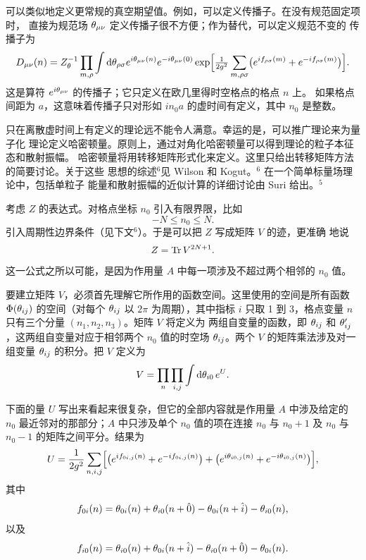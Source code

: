 可以类似地定义更常规的真空期望值。例如，可以定义传播子。在没有规范固定项时，
直接为规范场 $\theta_{\mu\nu}$ 定义传播子很不方便；作为替代，可以定义规范不变的
传播子为
\begin{equation}
D_{\mu\nu}(n) = Z_{\theta}^{-1}\prod_{m,\rho}\int\mathrm{d}\theta_{\rho\sigma}
  e^{i\theta_{\mu\nu}(n)}e^{-i\theta_{\mu\nu}(0)}
  \exp\!\Big[\tfrac{1}{2g^{2}}\sum_{m,\rho\sigma}
    \bigl(e^{if_{\rho\sigma}(m)}+e^{-if_{\rho\sigma}(m)}\bigr)\Big].
\label{eq:3.15}
\end{equation}
这是算符 $e^{i\theta_{\mu\nu}}$ 的传播子；它只定义在欧几里得时空格点的格点 $n$ 上。
如果格点间距为 $a$，这意味着传播子只对形如 $in_{0}a$ 的虚时间有定义，其中 $n_{0}$
是整数。

只在离散虚时间上有定义的理论远不能令人满意。幸运的是，可以推广理论来为量子化
理论定义哈密顿量。原则上，通过对角化哈密顿量可以得到理论的粒子本征态和散射振幅。
哈密顿量将用转移矩阵形式化来定义。这里只给出转移矩阵方法的简要讨论。关于这些
思想的综述${}^{6}$见 Wilson 和 Kogut。${}^{6}$ 在一个简单标量场理论中，包括单粒子
能量和散射振幅的近似计算的详细讨论由 Suri 给出。${}^{5}$

考虑 $Z$ 的表达式。对格点坐标 $n_{0}$ 引入有限界限，比如
\begin{equation}
-N \le n_{0} \le N.
\label{eq:3.16}
\end{equation}
引入周期性边界条件（见下文${}^{6}$）。于是可以把 $Z$ 写成矩阵 $V$ 的迹，更准确
地说
\begin{equation}
Z = \operatorname{Tr} V^{2N+1}.
\label{eq:3.17}
\end{equation}
这一公式之所以可能，是因为作用量 $A$ 中每一项涉及不超过两个相邻的 $n_{0}$ 值。

要建立矩阵 $V$，必须首先理解它所作用的函数空间。这里使用的空间是所有函数
$\Phi(\theta_{ij})$ 的空间（对每个 $\theta_{ij}$ 以 $2\pi$ 为周期），其中指标 $i$
只取 1 到 3，格点变量 $n$ 只有三个分量 $(n_{1},n_{2},n_{3})$。矩阵 $V$ 将定义为
两组自变量的函数，即 $\theta_{ij}$ 和 $\theta_{ij}'$，这两组自变量对应于相邻两个
$n_{0}$ 值的时空场 $\theta_{ij}$。两个 $V$ 的矩阵乘法涉及对一组变量 $\theta_{ij}$
的积分。把 $V$ 定义为
\begin{equation}
V = \prod_{n}\prod_{i,j}\int\mathrm{d}\theta_{i0}\,e^{U}.
\label{eq:3.18}
\end{equation}

下面的量 $U$ 写出来看起来很复杂，但它的全部内容就是作用量 $A$ 中涉及给定的
$n_{0}$ 最近邻对的那部分；$A$ 中只涉及单个 $n_{0}$ 值的项在连接 $n_{0}$ 与
$n_{0}+1$ 及 $n_{0}$ 与 $n_{0}-1$ 的矩阵之间平分。结果为
\begin{equation}
U = \frac{1}{2g^{2}}\sum_{n,i,j}\Bigl[
    \bigl(e^{if_{0i,j}(n)}+e^{-if_{0i,j}(n)}\bigr)
    +\bigl(e^{i\theta_{i0,j}(n)}+e^{-i\theta_{i0,j}(n)}\bigr)\Bigr],
\label{eq:3.19}
\end{equation}
其中
\begin{equation}
f_{0i}(n) = \theta_{0i}(n)+\theta_{i0}(n+\hat0)-\theta_{0i}(n+\hat i)-\theta_{i0}(n),
\label{eq:3.20}
\end{equation}
以及
\begin{equation}
f_{i0}(n) = \theta_{i0}(n)+\theta_{0i}(n+\hat i)-\theta_{i0}(n+\hat0)-\theta_{0i}(n).
\label{eq:3.21}
\end{equation}

